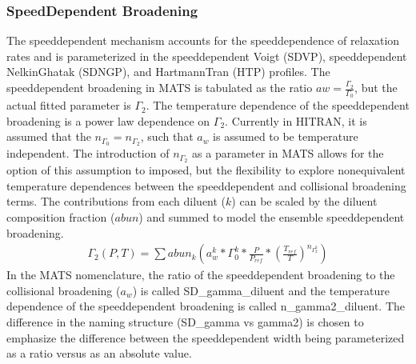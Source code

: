 \documentclass[letterpaper,10pt,english]{sphinxmanual}
\begin{document}
\subsubsection{Speed\sphinxhyphen{}Dependent Broadening}
\label{\detokenize{MATS Summary:speed-dependent-broadening}}
\sphinxAtStartPar
The speed\sphinxhyphen{}dependent mechanism accounts for the speed\sphinxhyphen{}dependence of relaxation rates and is parameterized in the speed\sphinxhyphen{}dependent Voigt (SDVP), speed\sphinxhyphen{}dependent Nelkin\sphinxhyphen{}Ghatak (SDNGP), and Hartmann\sphinxhyphen{}Tran (HTP) profiles.  The speed\sphinxhyphen{}dependent broadening in MATS is tabulated as the ratio \(a{w} = \frac{\Gamma_{2}}{\Gamma_{0}}\), but the actual fitted parameter is \(\Gamma_{2}\).  The temperature dependence of the speed\sphinxhyphen{}dependent broadening is a power law dependence on \(\Gamma_{2}\).  Currently in HITRAN, it is assumed that the \(n_{\Gamma_{0}} = n_{\Gamma_{2}}\), such that \(a_{w}\) is assumed to be temperature independent.  The introduction of \(n_{\Gamma_{2}}\) as a parameter in MATS allows for the option of this assumption to imposed, but the flexibility to explore non\sphinxhyphen{}equivalent temperature dependences between the speed\sphinxhyphen{}dependent and collisional broadening terms.  The contributions from each diluent (\(k\)) can be scaled by the diluent composition fraction (\(abun\)) and summed to model the ensemble speed\sphinxhyphen{}dependent broadening.
\begin{equation*}
\begin{split}\Gamma_{2} (P,T) = \sum abun_{k} (a_{w}^{k} *\Gamma_{0}^{k} * \frac{P}{P_{ref}} * (\frac{T_{ref}}{T})^{n_{\Gamma_{2}^{k}}})\end{split}
\end{equation*}
\sphinxAtStartPar
In the MATS nomenclature, the ratio of the speed\sphinxhyphen{}dependent broadening to the collisional broadening (\(a_{w}\)) is called SD\_gamma\_diluent and the temperature dependence of the speed\sphinxhyphen{}dependent broadening is called n\_gamma2\_diluent.  The difference in the naming structure (SD\_gamma vs gamma2) is chosen to emphasize the difference between the speed\sphinxhyphen{}dependent width being parameterized as a ratio versus as an absolute value.
\end{document}
